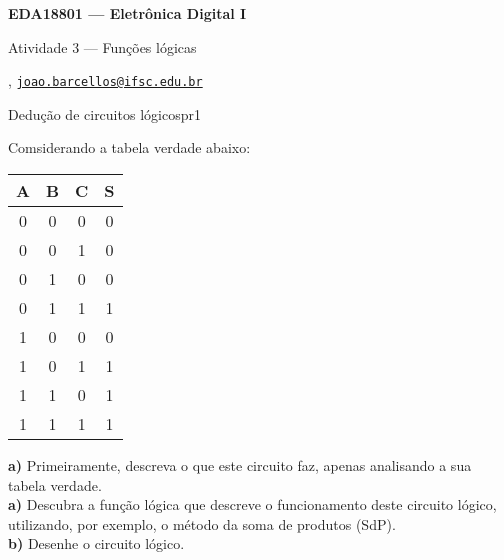 



\usepackage[style=numeric, citestyle=ieee]{biblatex}




\begin{Large}
    \textbf{EDA18801 --- Eletrônica Digital I}
    
    Atividade 3 --- Funções lógicas \hfill {}
\end{Large}

\vspace{1ex}
\textbf{} , \href{mailto:joao.barcellos@ifsc.edu.br}{\texttt{joao.barcellos@ifsc.edu.br}}\\
\textbf{}

\vspace{2ex}

\begin{problem}{Dedução de circuitos lógicos}{pr1}

Comsiderando a tabela verdade abaixo: \\

\begin{center}
    \begin{tabular}{| c | c | c | c |}
      \hline
      \rowcolor{Gray}
      A & B & C & S \\
      \hline
      0 & 0 & 0 & 0 \\
      0 & 0 & 1 & 0 \\
      0 & 1 & 0 & 0 \\
      0 & 1 & 1 & 1 \\
      1 & 0 & 0 & 0 \\
      1 & 0 & 1 & 1 \\
      1 & 1 & 0 & 1 \\
      1 & 1 & 1 & 1 \\
      \hline
    \end{tabular}
\end{center}

\textbf{a)} Primeiramente, descreva o que este circuito faz, apenas analisando a sua tabela verdade. \\

\textbf{a)} Descubra a função lógica que descreve o funcionamento deste circuito lógico, utilizando, por exemplo, o método da soma de produtos (SdP). \\

\textbf{b)} Desenhe o circuito lógico. \\

\end{problem}

